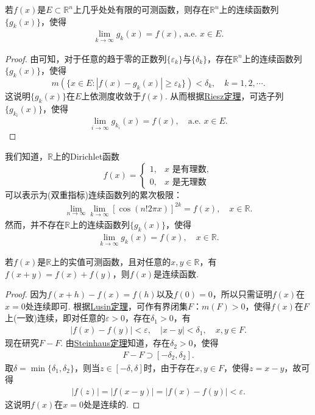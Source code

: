 \documentclass[../../main.tex]{subfiles}
\begin{document}
\begin{corollary}\label{corollary:推论3.20}
若\(f(x)\)是\(E \subset \mathbb{R}^{n}\)上几乎处处有限的可测函数，则存在\(\mathbb{R}^{n}\)上的连续函数列\(\{g_{k}(x)\}\)，使得
\begin{align*}
\lim_{k \to \infty} g_{k}(x) = f(x), \,\text{a.e. } x \in E. 
\end{align*}
\end{corollary}
\begin{proof}
由可知，对于任意的趋于零的正数列\(\{\varepsilon_{k}\}\)与\(\{\delta_{k}\}\)，存在\(\mathbb{R}^{n}\)上的连续函数列\(\{g_{k}(x)\}\)，使得
\[m(\{x \in E: |f(x) - g_{k}(x)| \geqslant \varepsilon_{k}\}) < \delta_{k}, \quad k = 1,2,\cdots.\]
这说明\(\{g_{k}(x)\}\)在\(E\)上依测度收敛于\(f(x)\). 从而根据\hyperref[theorem:Riesz定理]{Riesz定理}，可选子列\(\{g_{k_{i}}(x)\}\)，使得
\[\lim_{i \to \infty} g_{k_{i}}(x) = f(x), \quad \text{a.e. } x \in E.\] 
\end{proof}
\begin{remark}
我们知道，\(\mathbb{R}\)上的Dirichlet函数
\[f(x)=
\begin{cases}
1, & x\text{ 是有理数},\\
0, & x\text{ 是无理数}
\end{cases}\]
可以表示为(双重指标)连续函数列的累次极限：
\begin{align*}
\lim_{n \to \infty}\lim_{k \to \infty}[\cos(n!2\pi x)]^{2k}=f(x),\quad x\in\mathbb{R}.
\end{align*}
然而，并不存在\(\mathbb{R}\)上的连续函数列\(\{g_{k}(x)\}\)，使得
\begin{align*}
\lim_{k \to \infty}g_{k}(x)=f(x),\quad x\in\mathbb{R}.
\end{align*} 
\end{remark}

\begin{example}
若\(f(x)\)是\(\mathbb{R}\)上的实值可测函数，且对任意的\(x, y \in \mathbb{R}\)，有\(f(x + y) = f(x) + f(y)\)，则\(f(x)\)是连续函数.
\end{example}
\begin{proof}
因为\(f(x + h) - f(x) = f(h)\)以及\(f(0) = 0\)，所以只需证明\(f(x)\)在\(x = 0\)处连续即可. 根据\hyperref[theorem:Lusin(卢津)定理]{Lusin定理}，可作有界闭集\(F\)：\(m(F)>0\)，使得\(f(x)\)在\(F\)上(一致)连续，即对任意的\(\varepsilon > 0\)，存在\(\delta_1 > 0\)，有
\begin{align*}
|f(x) - f(y)| < \varepsilon, \quad |x - y| < \delta_1, \quad x, y \in F.
\end{align*}
现在研究\(F - F\). 由\hyperref[theorem:Steinhaus定理]{Steinhaus定理}知道，存在\(\delta_2 > 0\)，使得
\begin{align*}
F - F \supset [-\delta_2, \delta_2].
\end{align*}
取\(\delta = \min\{\delta_1, \delta_2\}\)，则当\(z \in [-\delta, \delta]\)时，由于存在\(x, y \in F\)，使得\(z = x - y\)，故可得
\begin{align*}
|f(z)| = |f(x - y)| = |f(x) - f(y)| < \varepsilon.
\end{align*}
这说明\(f(x)\)在\(x = 0\)处是连续的.
\end{proof}
\end{document}
